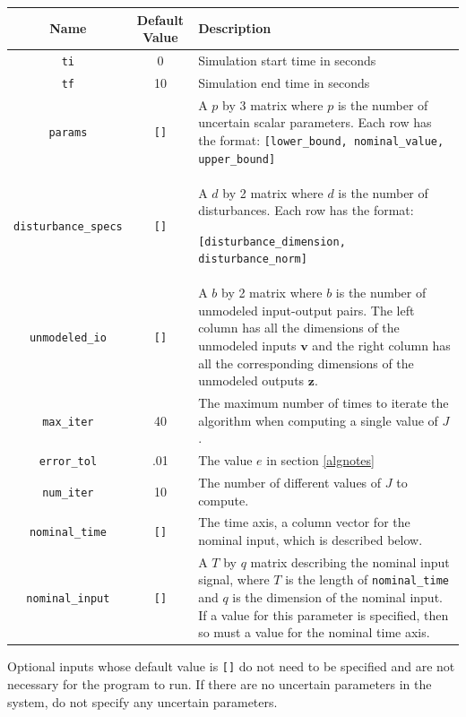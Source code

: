 \documentclass{article}
\begin{document}
\begin{table}[H]
\begin{center}
\begin{tabular}{| c | c | p{9cm} |}
\hline
\textbf{Name} & \textbf{Default Value} & \textbf{Description} \\
\hline
\texttt{ti} & 0 & Simulation start time in seconds \\
\hline 
\texttt{tf} & 10 & Simulation end time in seconds \\
\hline
\texttt{params} & \texttt{[]} & A $p$ by 3 matrix where $p$ is the number of
uncertain scalar parameters. Each row has the format:
\texttt{[lower\_bound, nominal\_value, upper\_bound]}\\
\hline
\texttt{disturbance\_specs} & \texttt{[]} & A $d$ by 2 matrix where $d$ is the
number of disturbances. Each row has the format:

\texttt{[disturbance\_dimension, disturbance\_norm]} \\
\hline
\texttt{unmodeled\_io} & \texttt{[]} & A $b$ by 2 matrix where $b$ is the number
of unmodeled input-output pairs. The left column has all the dimensions of the
unmodeled inputs $\mathbf{v}$ and the right column has all the corresponding
dimensions of the unmodeled outputs $\mathbf{z}$.\\
\hline
\texttt{max\_iter} & 40 & The maximum number of times to iterate the algorithm
when computing a single value of $J$.\\
\hline
\texttt{error\_tol} & .01 & The value $e$ in section \ref{algnotes} \\
\hline
\texttt{num\_iter} & 10 & The number of different values of $J$ to compute. \\
\hline
\texttt{nominal\_time} & \texttt{[]} & The time axis, a column vector for the
nominal input, which is described below. \\
\hline
\texttt{nominal\_input} & \texttt{[]} & A $T$ by $q$ matrix describing the
nominal input signal, where $T$ is the length of \texttt{nominal\_time} and $q$
is the dimension of the nominal input. If a value for this parameter is
specified, then so must a value for the nominal time axis. \\
\hline
\end{tabular}
\label{inputparameters}
\end{center}
\end{table}

Optional inputs whose default value is \texttt{[]} do not need to be specified
and are not necessary for the program to run. If there are no uncertain
parameters in the system, do not specify any uncertain parameters.
\end{document}
